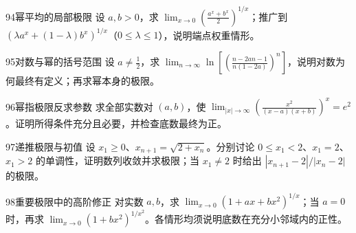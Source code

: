 \begin{exercise}{94}{幂平均的局部极限}
设 $a,b>0$，求 $\lim_{x\to0}\left(\frac{a^x+b^x}{2}\right)^{1/x}$；推广到 $\left(\lambda a^x+(1-\lambda)b^x\right)^{1/x}$（$0\le\lambda\le1$），说明端点权重情形。
\end{exercise}
\begin{exercise}{95}{对数与幂的括号范围}
设 $a\ne\frac12$，求 $\lim_{n\to\infty}\ln\left[\left(\frac{n-2an-1}{n(1-2a)}\right)^n\right]$，说明对数为何最终有定义；再求幂本身的极限。
\end{exercise}
\begin{exercise}{96}{幂指极限反求参数}
求全部实数对 $(a,b)$，使 $\lim_{|x|\to\infty}\left(\frac{x^2}{(x-a)(x+b)}\right)^x=e^2$。证明所得条件充分且必要，并检查底数最终为正。
\end{exercise}
\begin{exercise}{97}{递推极限与初值}
设 $x_1\ge0$、$x_{n+1}=\sqrt{2+x_n}$。分别讨论 $0\le x_1<2$、$x_1=2$、$x_1>2$ 的单调性，证明数列收敛并求极限；当 $x_1\ne2$ 时给出 $|x_{n+1}-2|/|x_n-2|$ 的极限。
\end{exercise}
\begin{exercise}{98}{重要极限中的高阶修正}
对实数 $a,b$，求 $\lim_{x\to0}(1+ax+bx^2)^{1/x}$；当 $a=0$ 时，再求 $\lim_{x\to0}(1+bx^2)^{1/x^2}$。各情形均须说明底数在充分小邻域内的正性。
\end{exercise}
